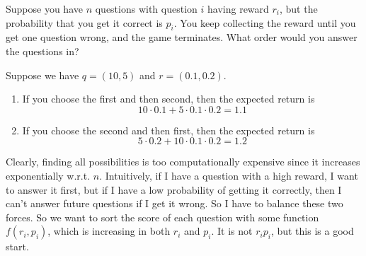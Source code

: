 \documentclass{article}
\begin{document}
  \begin{example}
    Suppose you have $n$ questions with question $i$ having reward $r_i$, but the probability that you get it correct is $p_i$. You keep collecting the reward until you get one question wrong, and the game terminates. What order would you answer the questions in? 

    Suppose we have $q = (10, 5)$ and $r = (0.1, 0.2)$. 
    \begin{enumerate}
      \item If you choose the first and then second, then the expected return is 
        \begin{equation}
          10 \cdot 0.1 + 5 \cdot 0.1 \cdot 0.2 = 1.1 
        \end{equation}

      \item If you choose the second and then first, then the expected return is 
        \begin{equation}
          5 \cdot 0.2 + 10 \cdot 0.1 \cdot 0.2 = 1.2
        \end{equation}
    \end{enumerate}
    Clearly, finding all possibilities is too computationally expensive since it increases exponentially w.r.t. $n$. Intuitively, if I have a question with a high reward, I want to answer it first, but if I have a low probability of getting it correctly, then I can't answer future questions if I get it wrong. So I have to balance these two forces. So we want to sort the score of each question with some function $f(r_i, p_i)$, which is increasing in both $r_i$ and $p_i$. It is not $r_i p_i$, but this is a good start. 
    

\end{example}
\end{document}
